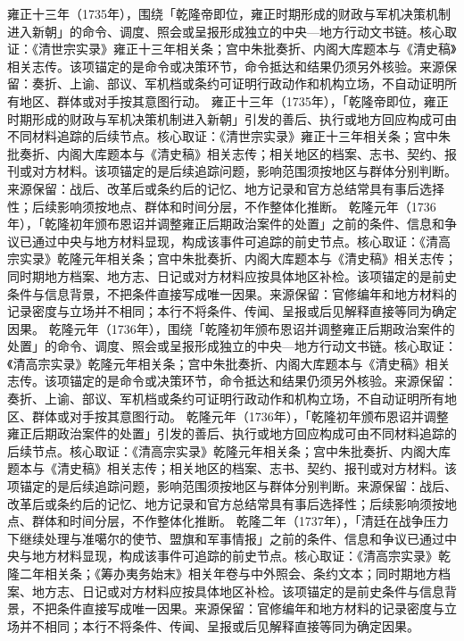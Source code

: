 雍正十三年（1735年），围绕「乾隆帝即位，雍正时期形成的财政与军机决策机制进入新朝」的命令、调度、照会或呈报形成独立的中央—地方行动文书链。核心取证：《清世宗实录》雍正十三年相关条；宫中朱批奏折、内阁大库题本与《清史稿》相关志传。该项锚定的是命令或决策环节，命令抵达和结果仍须另外核验。来源保留：奏折、上谕、部议、军机档或条约可证明行政动作和机构立场，不自动证明所有地区、群体或对手按其意图行动。
雍正十三年（1735年），「乾隆帝即位，雍正时期形成的财政与军机决策机制进入新朝」引发的善后、执行或地方回应构成可由不同材料追踪的后续节点。核心取证：《清世宗实录》雍正十三年相关条；宫中朱批奏折、内阁大库题本与《清史稿》相关志传；相关地区的档案、志书、契约、报刊或对方材料。该项锚定的是后续追踪问题，影响范围须按地区与群体分别判断。来源保留：战后、改革后或条约后的记忆、地方记录和官方总结常具有事后选择性；后续影响须按地点、群体和时间分层，不作整体化推断。
乾隆元年（1736年），「乾隆初年颁布恩诏并调整雍正后期政治案件的处置」之前的条件、信息和争议已通过中央与地方材料显现，构成该事件可追踪的前史节点。核心取证：《清高宗实录》乾隆元年相关条；宫中朱批奏折、内阁大库题本与《清史稿》相关志传；同时期地方档案、地方志、日记或对方材料应按具体地区补检。该项锚定的是前史条件与信息背景，不把条件直接写成唯一因果。来源保留：官修编年和地方材料的记录密度与立场并不相同；本行不将条件、传闻、呈报或后见解释直接等同为确定因果。
乾隆元年（1736年），围绕「乾隆初年颁布恩诏并调整雍正后期政治案件的处置」的命令、调度、照会或呈报形成独立的中央—地方行动文书链。核心取证：《清高宗实录》乾隆元年相关条；宫中朱批奏折、内阁大库题本与《清史稿》相关志传。该项锚定的是命令或决策环节，命令抵达和结果仍须另外核验。来源保留：奏折、上谕、部议、军机档或条约可证明行政动作和机构立场，不自动证明所有地区、群体或对手按其意图行动。
乾隆元年（1736年），「乾隆初年颁布恩诏并调整雍正后期政治案件的处置」引发的善后、执行或地方回应构成可由不同材料追踪的后续节点。核心取证：《清高宗实录》乾隆元年相关条；宫中朱批奏折、内阁大库题本与《清史稿》相关志传；相关地区的档案、志书、契约、报刊或对方材料。该项锚定的是后续追踪问题，影响范围须按地区与群体分别判断。来源保留：战后、改革后或条约后的记忆、地方记录和官方总结常具有事后选择性；后续影响须按地点、群体和时间分层，不作整体化推断。
乾隆二年（1737年），「清廷在战争压力下继续处理与准噶尔的使节、盟旗和军事情报」之前的条件、信息和争议已通过中央与地方材料显现，构成该事件可追踪的前史节点。核心取证：《清高宗实录》乾隆二年相关条；《筹办夷务始末》相关年卷与中外照会、条约文本；同时期地方档案、地方志、日记或对方材料应按具体地区补检。该项锚定的是前史条件与信息背景，不把条件直接写成唯一因果。来源保留：官修编年和地方材料的记录密度与立场并不相同；本行不将条件、传闻、呈报或后见解释直接等同为确定因果。
